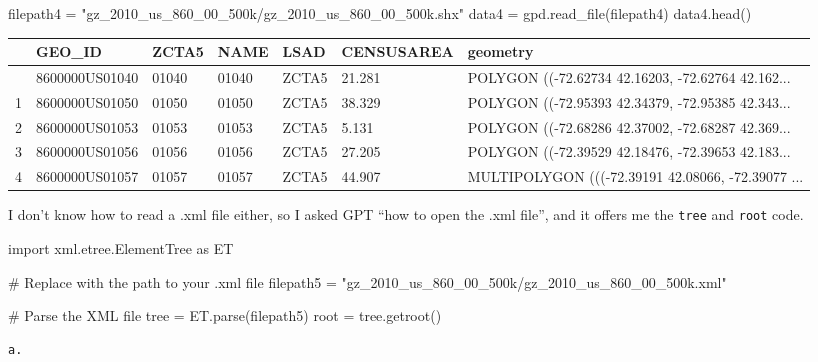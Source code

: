 \documentclass[
  letterpaper,
  DIV=11,
  numbers=noendperiod]{scrartcl}
\newenvironment{Shaded}{\begin{snugshade}}{\end{snugshade}}
\newcommand{\CommentTok}[1]{\textcolor[rgb]{0.37,0.37,0.37}{#1}}
\newcommand{\ImportTok}[1]{\textcolor[rgb]{0.00,0.46,0.62}{#1}}
\newcommand{\NormalTok}[1]{\textcolor[rgb]{0.00,0.23,0.31}{#1}}
\newcommand{\OperatorTok}[1]{\textcolor[rgb]{0.37,0.37,0.37}{#1}}
\newcommand{\StringTok}[1]{\textcolor[rgb]{0.13,0.47,0.30}{#1}}
\begin{document}
\begin{Shaded}
\begin{Highlighting}[]
\NormalTok{filepath4 }\OperatorTok{=} \StringTok{"gz\_2010\_us\_860\_00\_500k/gz\_2010\_us\_860\_00\_500k.shx"}
\NormalTok{data4 }\OperatorTok{=}\NormalTok{ gpd.read\_file(filepath4)}
\NormalTok{data4.head()}
\end{Highlighting}
\end{Shaded}

\begin{longtable}[]{@{}lllllll@{}}
\toprule\noalign{}
& GEO\_ID & ZCTA5 & NAME & LSAD & CENSUSAREA & geometry \\
\midrule\noalign{}
\endhead
\bottomrule\noalign{}
\endlastfoot
0 & 8600000US01040 & 01040 & 01040 & ZCTA5 & 21.281 & POLYGON
((-72.62734 42.16203, -72.62764 42.162... \\
1 & 8600000US01050 & 01050 & 01050 & ZCTA5 & 38.329 & POLYGON
((-72.95393 42.34379, -72.95385 42.343... \\
2 & 8600000US01053 & 01053 & 01053 & ZCTA5 & 5.131 & POLYGON ((-72.68286
42.37002, -72.68287 42.369... \\
3 & 8600000US01056 & 01056 & 01056 & ZCTA5 & 27.205 & POLYGON
((-72.39529 42.18476, -72.39653 42.183... \\
4 & 8600000US01057 & 01057 & 01057 & ZCTA5 & 44.907 & MULTIPOLYGON
(((-72.39191 42.08066, -72.39077 ... \\
\end{longtable}

I don't know how to read a .xml file either, so I asked GPT ``how to
open the .xml file'', and it offers me the \texttt{tree} and
\texttt{root} code.

\begin{Shaded}
\begin{Highlighting}[]
\ImportTok{import}\NormalTok{ xml.etree.ElementTree }\ImportTok{as}\NormalTok{ ET}

\CommentTok{\# Replace with the path to your .xml file}
\NormalTok{filepath5 }\OperatorTok{=} \StringTok{"gz\_2010\_us\_860\_00\_500k/gz\_2010\_us\_860\_00\_500k.xml"}

\CommentTok{\# Parse the XML file}
\NormalTok{tree }\OperatorTok{=}\NormalTok{ ET.parse(filepath5)}
\NormalTok{root }\OperatorTok{=}\NormalTok{ tree.getroot()}
\end{Highlighting}
\end{Shaded}

\begin{verbatim}
a.
\end{verbatim}
\end{document}
